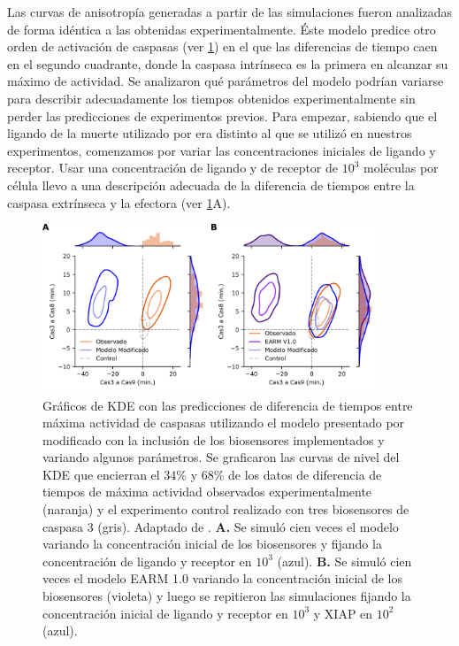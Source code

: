 Las curvas de anisotropía generadas a partir de las simulaciones fueron analizadas de forma idéntica a las obtenidas experimentalmente. Éste modelo predice otro orden de activación de caspasas (ver \cref{fig:hist_extrinseco}) en el que las diferencias de tiempo caen en el segundo cuadrante, donde la caspasa intrínseca es la primera en alcanzar su máximo de actividad. Se analizaron qué parámetros del modelo podrían variarse para describir adecuadamente los tiempos obtenidos experimentalmente sin perder las predicciones de experimentos previos. Para empezar, sabiendo que el ligando de la muerte utilizado por \cite{Albeck2008} era distinto al que se utilizó en nuestros experimentos, comenzamos por variar las concentraciones iniciales de ligando y receptor. Usar una concentración de ligando y de receptor de $10^3$ moléculas por célula llevo a una descripción adecuada de la diferencia de tiempos entre la caspasa extrínseca y la efectora (ver \cref{fig:hist_extrinseco}A).

\begin{figure}[t!]
    \centering
    \includegraphics[width=0.9\textwidth]{img/cap_4/histogramas_extrinseco.png}
    \caption{\footnotesize{Gráficos de KDE con las predicciones de diferencia de tiempos entre máxima actividad de caspasas utilizando el modelo presentado por \cite{Albeck2008} modificado con la inclusión de los biosensores implementados y variando algunos parámetros. Se graficaron las curvas de nivel del KDE que encierran el 34\% y 68\% de los datos de diferencia de tiempos de máxima actividad observados experimentalmente (naranja) y el experimento control realizado con tres biosensores de caspasa 3 (gris). Adaptado de \cite{Corbat2018}. \textbf{A.} Se simuló cien veces el modelo variando la concentración inicial de los biosensores y fijando la concentración de ligando y receptor en $10^3$ (azul). \textbf{B.} Se simuló cien veces el modelo EARM 1.0 variando la concentración inicial de los biosensores (violeta) y luego se repitieron las simulaciones fijando la concentración inicial de ligando y receptor en $10^3$ y XIAP en $10^2$ (azul).}}
    \label{fig:hist_extrinseco}
\end{figure}

